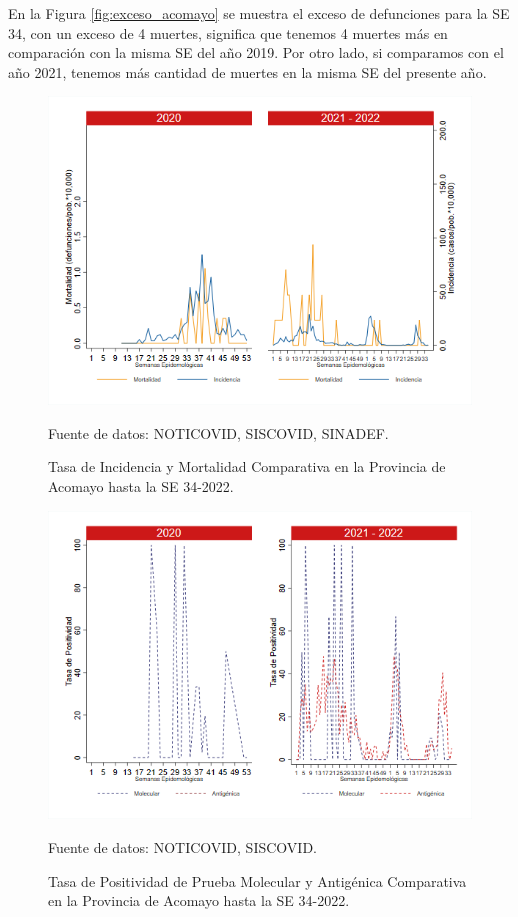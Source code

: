 \documentclass[12pt,a4paper,openany]{book}
\begin{document}
	En la Figura \ref{fig:exceso_acomayo} se muestra el exceso de defunciones para la SE 34, con un exceso de 4 muertes, significa que tenemos 4 muertes más en comparación con la misma SE del año 2019. Por otro lado, si comparamos con el año 2021, tenemos más cantidad de muertes en la misma SE del presente año.
	\begin{figure}[h]
		\caption{Tasa de Incidencia y Mortalidad Comparativa en la Provincia de Acomayo hasta la SE 34-2022.}\label{fig:inc_mort_acomayo}
		\begin{center}
			\includegraphics[width=0.70\linewidth]{../figuras/incidencia_mortalidad_20_21_1.png}
		\end{center}
		{\footnotesize {Fuente de datos: NOTICOVID, SISCOVID, SINADEF.}}
	\end{figure}
	
	\begin{figure}[h]
		\caption{Tasa de Positividad de Prueba Molecular y Antigénica Comparativa en la Provincia de Acomayo hasta la SE 34-2022. }\label{fig:positividad_acomayo}
		\begin{center}
			\includegraphics[width=0.7\linewidth]{../figuras/positividad_20_21_1.png}
		\end{center}
		{\footnotesize {Fuente de datos: NOTICOVID, SISCOVID.}}
	\end{figure}
	
\end{document}
